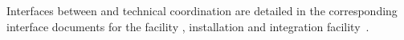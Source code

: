 Interfaces between  and technical coordination are detailed in the corresponding interface documents for the facility \cite{bib:docdb6991}, installation \cite{bib:docdb7018}
and integration facility~\cite{bib:docdb7045}.


















